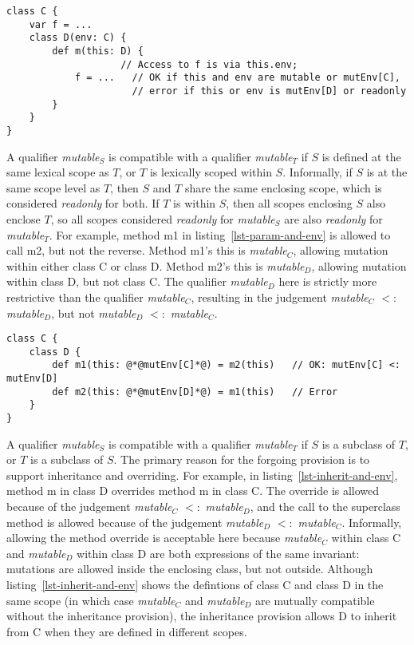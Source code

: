 \begin{lstlisting}[caption={Accessing an Enclosing Environment (3)},float={htpb},label={lst-enclosing-env-3}]
class C {
	var f = ...
	class D(env: C) {
		def m(this: D) {
		            // Access to f is via this.env;
			f = ...   // OK if this and env are mutable or mutEnv[C],
			          // error if this or env is mutEnv[D] or readonly
		}
	}
}
\end{lstlisting}

A qualifier \mbox{{\em mutable}$_S$} is compatible with a qualifier \mbox{{\em mutable}$_T$}
if $S$ is defined at the same lexical scope as $T$, or
$T$ is lexically scoped within $S$.
Informally, if $S$ is at the same scope level as $T$, then $S$ and $T$ share the same
enclosing scope, which is considered {\em readonly} for both.
If $T$ is within $S$, then all scopes enclosing $S$ also enclose $T$,
so all scopes considered {\em readonly} for \mbox{{\em mutable}$_S$} are also {\em readonly}
for \mbox{{\em mutable}$_T$}.
For example, method {\cd m1} in listing~\ref{lst-param-and-env} is allowed
to call {\cd m2}, but not the reverse.
Method {\cd m1}'s {\cd this} is \mbox{{\em mutable}$_C$}, allowing mutation within either
class {\cd C} or class {\cd D}.
Method {\cd m2}'s {\cd this} is \mbox{{\em mutable}$_D$}, allowing mutation within class
{\cd D}, but not class {\cd C}.
The qualifier \mbox{{\em mutable}$_D$} here is strictly more restrictive than
the qualifier \mbox{{\em mutable}$_C$}, resulting in the
judgement \mbox{{\em mutable}$_C$} $<:$ \mbox{{\em mutable}$_D$},
but not \mbox{{\em mutable}$_D$} $<:$ \mbox{{\em mutable}$_C$}.

\begin{lstlisting}[caption={Parameters and Environment References},float={htpb},label={lst-param-and-env}]
class C {
	class D {
		def m1(this: @*@mutEnv[C]*@) = m2(this)   // OK: mutEnv[C] <: mutEnv[D]
		def m2(this: @*@mutEnv[D]*@) = m1(this)   // Error
	}
}
\end{lstlisting}

A qualifier \mbox{{\em mutable}$_S$} is compatible with a qualifier \mbox{{\em mutable}$_T$}
if $S$ is a subclass of $T$, or $T$ is a subclass of $S$.
The primary reason for the forgoing provision is to support
inheritance and overriding.
For example, in listing~\ref{lst-inherit-and-env}, method {\cd m} in class {\cd D}
overrides method {\cd m} in class {\cd C}.
The override is allowed because of the judgement \mbox{{\em mutable}$_C$} $<:$ \mbox{{\em mutable}$_D$},
and the call to the superclass method is allowed because of
the judgement \mbox{{\em mutable}$_D$} $<:$ \mbox{{\em mutable}$_C$}.
Informally, allowing the method override is acceptable here because \mbox{{\em mutable}$_C$}
within class {\cd C} and \mbox{{\em mutable}$_D$} within class {\cd D} are both
expressions of the same invariant: mutations are allowed inside the enclosing
class, but not outside.
Although listing~\ref{lst-inherit-and-env} shows the defintions of class {\cd C}
and class {\cd D} in the same scope (in which case \mbox{{\em mutable}$_C$} and \mbox{{\em mutable}$_D$}
are mutually compatible without the inheritance provision), the inheritance provision
allows {\cd D} to inherit from {\cd C} when they are defined in different scopes.

